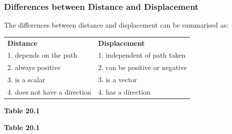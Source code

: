             \subsubsection{ Differences between Distance and Displacement}
            \nopagebreak
        \label{m38788*id63938}The differences between distance and displacement can be summarised as:\par 
          \begin{table}[H]
        \begin{center}
      \label{m38788*id63941}
    \noindent
      \tablelasttail{}
      \begin{xtabular}[t]{|l|l|}\hline
                  \textbf{ Distance }
                 &
                  \textbf{ Displacement }
     \tabularnewline{}
        1. depends on the path &
        1. independent of path taken%
     \tabularnewline{}
        2. always positive &
        2. can be positive or negative%
     \tabularnewline{}
        3. is a scalar &
        3. is a vector%
     \tabularnewline{}
        4. does not have a direction &
        4. has a direction%
     \tabularnewline{}
    \end{xtabular}
      \end{center}
    \begin{center}{\small\bfseries Table 20.1}\end{center}
    \begin{caption}{\small\bfseries Table 20.1}\end{caption}
\end{table}
    \par
\label{m38788*secfhsst!!!underscore!!!id498}
